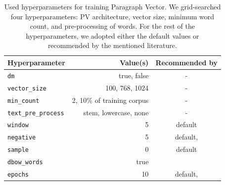 \begin{table}[b]
  \footnotesize
  \centering
  \begin{tabular}{lrc}
    \toprule
    Hyperparameter & Value(s) & Recommended by \\
    \midrule
    \texttt{dm} & true, false & - \\
    \texttt{vector\_size} & 100, 768, 1024 & - \\
    \texttt{min\_count} & 2, 10\% of training corpus& - \\
    \texttt{text\_pre\_process} & stem, lowercase, none & - \\
    \texttt{window} & 5 & default \\
    \texttt{negative} & 5 & default, \cite{lau2016empirical} \\
    \texttt{sample} & 0 & default \\
    \texttt{dbow\_words} & true & \cite{lau2016empirical} \\
    \texttt{epochs} & 10 & default, \cite{dai2015document} \\
    \bottomrule
  \end{tabular}

  \caption{Used hyperparameters for training Paragraph Vector. We grid-searched
  four hyperparameters: PV architecture, vector size, minimum word count, and
  pre-processing of words. For the rest of the hyperparameters, we adopted either the
  default values or recommended by the mentioned literature.}

  \label{table:pv_hyperparams}

\end{table}


